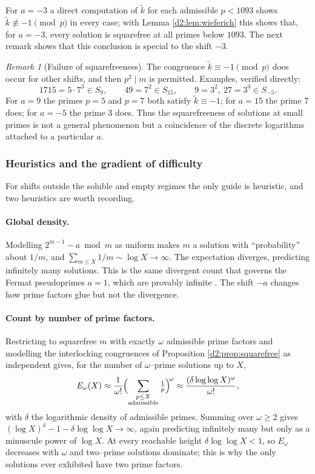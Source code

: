 \documentclass[a4paper]{article}
\theoremstyle{plain}
\theoremstyle{definition}
\theoremstyle{remark}
\newtheorem{remark}{Remark}[subsection]
\newcommand{\dvd}{\mid}
\begin{document}
For $a=-3$ a direct computation of $\widetilde k$ for each admissible $p<1093$ shows $\widetilde k\not\equiv-1\pmod p$ in every case; with Lemma \ref{d2:lem:wieferich} this shows that, for $a=-3$, every solution is squarefree at all primes below $1093$. The next remark shows that this conclusion is special to the shift $-3$.

\begin{remark}[Failure of squarefreeness]\label{d2:rem:sqfree-fail}
The congruence $\widetilde k\equiv-1\pmod p$ does occur for other shifts, and then $p^{2}\dvd m$ is permitted. Examples, verified directly:
\[
1715=5\cdot7^{3}\in S_{9},\qquad 49=7^{2}\in S_{15},\qquad 9=3^{2},\ 27=3^{3}\in S_{-5}.
\]
For $a=9$ the primes $p=5$ and $p=7$ both satisfy $\widetilde k\equiv-1$; for $a=15$ the prime $7$ does; for $a=-5$ the prime $3$ does. Thus the squarefreeness of solutions at small primes is not a general phenomenon but a coincidence of the discrete logarithms attached to a particular $a$.
\end{remark}

\subsubsection{Heuristics and the gradient of difficulty}\label{d2:sec:heuristics}

For shifts outside the soluble and empty regimes the only guide is heuristic, and two heuristics are worth recording.

\paragraph{Global density.} Modelling $2^{m-1}-a\bmod m$ as uniform makes $m$ a solution with ``probability'' about $1/m$, and $\sum_{m\le X}1/m\sim\log X\to\infty$. The expectation diverges, predicting infinitely many solutions. This is the same divergent count that governs the Fermat pseudoprimes $a=1$, which are provably infinite \cite{d2:cipolla,d2:pomerance}. The shift $-a$ changes how prime factors glue but not the divergence.

\paragraph{Count by number of prime factors.} Restricting to squarefree $m$ with exactly $\omega$ admissible prime factors and modelling the interlocking congruences of Proposition \ref{d2:prop:squarefree} as independent gives, for the number of $\omega$--prime solutions up to $X$,
\[
E_\omega(X)\approx\frac1{\omega!}\Bigl(\sum_{\substack{p\le X\\ \text{admissible}}}\tfrac1p\Bigr)^{\!\omega}\approx\frac{(\delta\log\log X)^{\omega}}{\omega!},
\]
with $\delta$ the logarithmic density of admissible primes. Summing over $\omega\ge2$ gives $(\log X)^{\delta}-1-\delta\log\log X\to\infty$, again predicting infinitely many but only as a minuscule power of $\log X$. At every reachable height $\delta\log\log X<1$, so $E_\omega$ decreases with $\omega$ and two--prime solutions dominate; this is why the only solutions ever exhibited have two prime factors.
\end{document}

